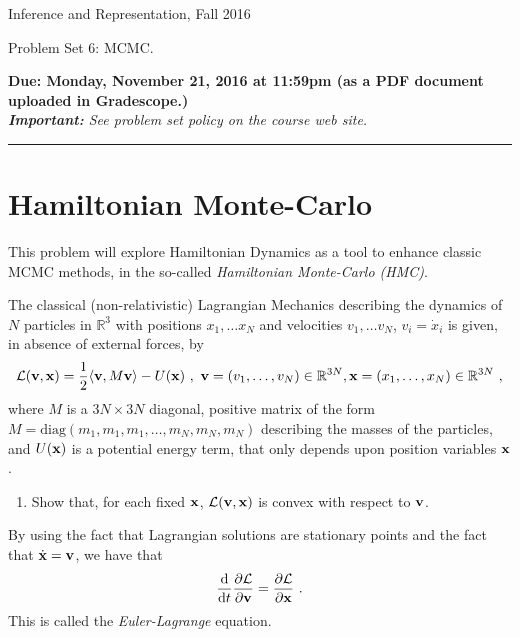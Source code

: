\documentclass{article}
\newcommand{\ruleskip}{\bigskip\hrule\bigskip}
\newcommand{\R}{\mathbb{R}}
\newcommand{\xx}{{\bf x}}
\newcommand{\vv}{{\bf v}}
\begin{document}
\pagestyle{myheadings} 

{\LARGE
\begin{center}Inference and Representation, Fall 2016\end{center}
}

{\Large
Problem Set 6: MCMC.
}


{\bf Due: Monday, November 21, 2016 at 11:59pm (as a PDF document uploaded in
  Gradescope.)}\\

{\em {\bf Important:} See problem set policy on the course web site.}
\ruleskip



\section*{Hamiltonian Monte-Carlo} 
This problem will explore Hamiltonian Dynamics as a tool 
to enhance classic MCMC methods, in the so-called \emph{Hamiltonian Monte-Carlo (HMC)}. 

The classical (non-relativistic) Lagrangian Mechanics describing the dynamics of $N$ particles in $\R^3$ with positions $x_1, \dots x_N$ and velocities $v_1, \dots v_N$, $v_i = \dot{x}_i$ is given, in absence of external forces, by 
\begin{equation}
\mathcal{L}(\vv, \xx) = \frac{1}{2} \langle \vv, M \vv \rangle - U(\xx)~,~\vv=(v_1, \dots, v_N) \in \R^{3N}, \xx=(x_1, \dots, x_N) \in \R^{3N}~,
\end{equation} 
where $M$ is a $3N \times 3N$ diagonal, positive matrix of the form $M = \text{diag}(m_1, m_1, m_1, \dots, m_N, m_N, m_N)$ describing
the masses of the particles, and $U(\xx)$ is a potential energy term, that only depends upon position variables $\xx$.
\begin{enumerate}
\item Show that, for each fixed $\xx$, $\mathcal{L}(\vv, \xx)$ is convex with respect to $\vv$. 
\end{enumerate}
By using the fact that Lagrangian solutions are stationary points and the fact that 
$\dot{\xx} = \vv$, we have that
\begin{equation}
\frac{\mathrm{d}}{\mathrm{d}t} \frac{\partial \mathcal{L}}{\partial \vv} = \frac{\partial \mathcal{L}}{\partial \xx}~.
\end{equation}
This is called the \emph{Euler-Lagrange} equation.
\end{document}
